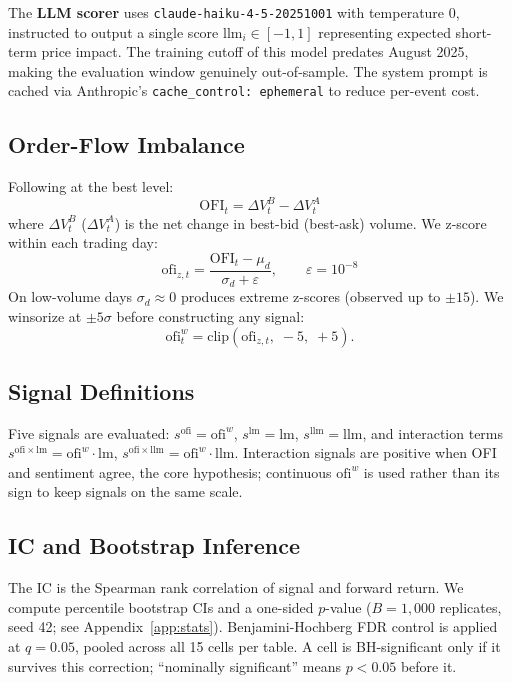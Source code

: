 \documentclass[11pt, letterpaper]{article}
\begin{document}
The \textbf{LLM scorer} uses \texttt{claude-haiku-4-5-20251001} with temperature 0,
instructed to output a single score $\mathrm{llm}_i \in [-1,1]$ representing expected
short-term price impact. The training cutoff of this model predates August 2025,
making the evaluation window genuinely out-of-sample. The system prompt is cached
via Anthropic's \texttt{cache\_control: ephemeral} to reduce per-event cost.

\subsection{Order-Flow Imbalance}

Following \citet{cont2014price} at the best level:
\begin{equation}
    \mathrm{OFI}_t = \Delta V^B_t - \Delta V^A_t
\end{equation}
where $\Delta V^B_t$ ($\Delta V^A_t$) is the net change in best-bid (best-ask)
volume. We z-score within each trading day:
\begin{equation}
    \mathrm{ofi}_{z,t} = \frac{\mathrm{OFI}_t - \mu_d}{\sigma_d + \varepsilon},
    \qquad \varepsilon = 10^{-8}
\end{equation}
On low-volume days $\sigma_d \approx 0$ produces extreme z-scores (observed up to
$\pm 15$). We winsorize at $\pm 5\sigma$ before constructing any signal:
\begin{equation}
    \mathrm{ofi}^w_t = \mathrm{clip}(\mathrm{ofi}_{z,t},\; -5,\; +5).
\end{equation}

\subsection{Signal Definitions}

Five signals are evaluated: $s^\mathrm{ofi} = \mathrm{ofi}^w$, $s^\mathrm{lm} = \mathrm{lm}$,
$s^\mathrm{llm} = \mathrm{llm}$, and interaction terms $s^{\mathrm{ofi\times lm}} =
\mathrm{ofi}^w \cdot \mathrm{lm}$, $s^{\mathrm{ofi\times llm}} = \mathrm{ofi}^w \cdot
\mathrm{llm}$. Interaction signals are positive when OFI and sentiment agree, the core
hypothesis; continuous $\mathrm{ofi}^w$ is used rather than its sign to keep signals
on the same scale.

\subsection{IC and Bootstrap Inference}

The IC is the Spearman rank correlation of signal and forward return. We compute
percentile bootstrap CIs and a one-sided $p$-value ($B = 1{,}000$ replicates, seed 42;
see Appendix~\ref{app:stats}). Benjamini-Hochberg FDR control \citep{benjamini1995controlling}
is applied at $q = 0.05$, pooled across all 15 cells per table. A cell is BH-significant
only if it survives this correction; ``nominally significant'' means $p < 0.05$ before it.
\end{document}
